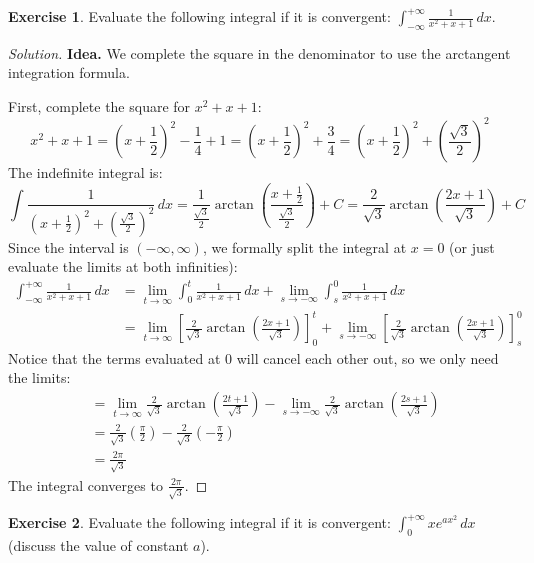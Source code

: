 \documentclass[11pt]{article}
\theoremstyle{definition}
\newtheorem{exercise}{Exercise}[section]
\newenvironment{solution}{\begin{proof}[Solution]}{\end{proof}}
\begin{document}
\begin{exercise}
Evaluate the following integral if it is convergent: $\displaystyle \int_{-\infty}^{+\infty} \frac{1}{x^2+x+1}\,dx$.
\end{exercise}

\begin{solution}
\textbf{Idea.} We complete the square in the denominator to use the arctangent integration formula.

First, complete the square for $x^2 + x + 1$:
\[
x^2 + x + 1 = \left(x + \frac{1}{2}\right)^2 - \frac{1}{4} + 1 = \left(x + \frac{1}{2}\right)^2 + \frac{3}{4} = \left(x + \frac{1}{2}\right)^2 + \left(\frac{\sqrt{3}}{2}\right)^2
\]
The indefinite integral is:
\[
\int \frac{1}{\left(x + \frac{1}{2}\right)^2 + \left(\frac{\sqrt{3}}{2}\right)^2} \,dx = \frac{1}{\frac{\sqrt{3}}{2}} \arctan\left( \frac{x + \frac{1}{2}}{\frac{\sqrt{3}}{2}} \right) + C = \frac{2}{\sqrt{3}} \arctan\left( \frac{2x+1}{\sqrt{3}} \right) + C
\]
Since the interval is $(-\infty, \infty)$, we formally split the integral at $x = 0$ (or just evaluate the limits at both infinities):
\begin{align*}
\int_{-\infty}^{+\infty} \frac{1}{x^2+x+1}\,dx &= \lim_{t \to \infty} \int_0^t \frac{1}{x^2+x+1}\,dx + \lim_{s \to -\infty} \int_s^0 \frac{1}{x^2+x+1}\,dx \\
&= \lim_{t \to \infty} \left[ \frac{2}{\sqrt{3}} \arctan\left( \frac{2x+1}{\sqrt{3}} \right) \right]_0^t + \lim_{s \to -\infty} \left[ \frac{2}{\sqrt{3}} \arctan\left( \frac{2x+1}{\sqrt{3}} \right) \right]_s^0
\end{align*}
Notice that the terms evaluated at $0$ will cancel each other out, so we only need the limits:
\begin{align*}
&= \lim_{t \to \infty} \frac{2}{\sqrt{3}} \arctan\left( \frac{2t+1}{\sqrt{3}} \right) - \lim_{s \to -\infty} \frac{2}{\sqrt{3}} \arctan\left( \frac{2s+1}{\sqrt{3}} \right) \\
&= \frac{2}{\sqrt{3}} \left( \frac{\pi}{2} \right) - \frac{2}{\sqrt{3}} \left( -\frac{\pi}{2} \right) \\
&= \frac{2\pi}{\sqrt{3}}
\end{align*}
The integral converges to $\frac{2\pi}{\sqrt{3}}$.
\end{solution}

\begin{exercise}
Evaluate the following integral if it is convergent: $\displaystyle \int_0^{+\infty} xe^{ax^2}\,dx$ (discuss the value of constant $a$).
\end{exercise}
\end{document}
